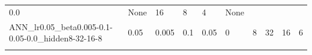 \documentclass[11pt, a4paper , landscape]{article}
\begin{document}
\begin{longtable}[]{@{}llllllllll@{}}
\begin{minipage}[t]{0.05\columnwidth}
0.0\strut
\end{minipage} & \begin{minipage}[t]{0.05\columnwidth}\raggedright\strut
None\strut
\end{minipage} & \begin{minipage}[t]{0.10\columnwidth}\raggedright\strut
16\strut
\end{minipage} & \begin{minipage}[t]{0.10\columnwidth}\raggedright\strut
8\strut
\end{minipage} & \begin{minipage}[t]{0.09\columnwidth}\raggedright\strut
4\strut
\end{minipage} & \begin{minipage}[t]{0.11\columnwidth}\raggedright\strut
None\strut
\end{minipage}\tabularnewline
\begin{minipage}[t]{0.04\columnwidth}\raggedright\strut
ANN\_lr0.05\_beta0.005-0.1-0.05-0.0\_hidden8-32-16-8\strut
\end{minipage} & \begin{minipage}[t]{0.09\columnwidth}\raggedright\strut
0.05\strut
\end{minipage} & \begin{minipage}[t]{0.04\columnwidth}\raggedright\strut
0.005\strut
\end{minipage} & \begin{minipage}[t]{0.05\columnwidth}\raggedright\strut
0.1\strut
\end{minipage} & \begin{minipage}[t]{0.05\columnwidth}\raggedright\strut
0.05\strut
\end{minipage} & \begin{minipage}[t]{0.05\columnwidth}\raggedright\strut
0\strut
\end{minipage} & \begin{minipage}[t]{0.10\columnwidth}\raggedright\strut
8\strut
\end{minipage} & \begin{minipage}[t]{0.10\columnwidth}\raggedright\strut
32\strut
\end{minipage} & \begin{minipage}[t]{0.09\columnwidth}\raggedright\strut
16\strut
\end{minipage} & \begin{minipage}[t]{0.11\columnwidth}\raggedright\strut
6\strut
\end{minipage}\tabularnewline
\begin{minipage}[t]{0.04\columnwidth}\raggedright\strut

\end{minipage}
\end{longtable}
\end{document}
